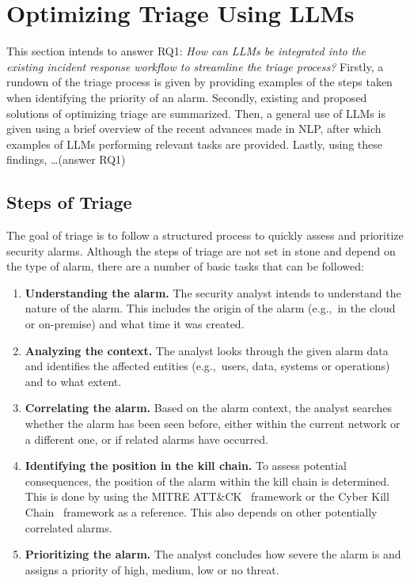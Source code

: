 \section{Optimizing Triage Using LLMs}
\label{sec:rq1}

This section intends to answer RQ1: \textit{How can LLMs be integrated into the existing incident response workflow to
streamline the triage process?}
Firstly, a rundown of the triage process is given by providing examples of the steps taken when identifying the priority
of an alarm.
Secondly, existing and proposed solutions of optimizing triage are summarized.
Then, a general use of LLMs is given using a brief overview of the recent advances made in NLP, after which examples
of LLMs performing relevant tasks are provided.
Lastly, using these findings, \dots (answer RQ1) %

\subsection{Steps of Triage}
\label{subsec:rq1-steps-of-triage}

The goal of triage is to follow a structured process to quickly assess and prioritize security alarms.
Although the steps of triage are not set in stone and depend on the type of alarm, there are a number of basic tasks
that can be followed:
\begin{enumerate}
    \item \textbf{Understanding the alarm.}
    The security analyst intends to understand the nature of the alarm.
    This includes the origin of the alarm (e.g.,\ in the cloud or on-premise) and what time it was created.
    \item \textbf{Analyzing the context.}
    The analyst looks through the given alarm data and identifies the affected entities (e.g.,\ users, data, systems or
    operations) and to what extent.
    \item \textbf{Correlating the alarm.}
    Based on the alarm context, the analyst searches whether the alarm has been seen before, either within the current
    network or a different one, or if related alarms have occurred.
    \item \textbf{Identifying the position in the kill chain.}
    To assess potential consequences, the position of the alarm within the kill chain is determined.
    This is done by using the MITRE ATT\&CK\ \citep{strom2018mitre} framework or the Cyber Kill
    Chain\ \citep{lockheed2011ckc} framework as a reference.
    This also depends on other potentially correlated alarms.
    \item \textbf{Prioritizing the alarm.}
    The analyst concludes how severe the alarm is and assigns a priority of high, medium, low or no threat.
\end{enumerate}

